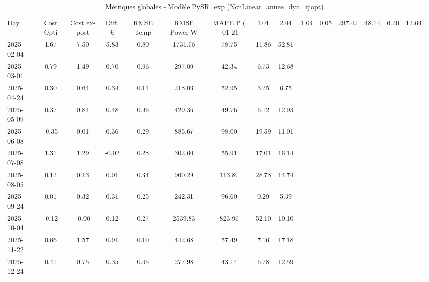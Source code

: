 \begin{table}
\caption{Métriques globales - Modèle PySR_exp (NonLinear_annee_dyn_ipopt)}
\label{tab:PySR_exp_NonLinear_annee_dyn_ipopt_Validation_EPlus_VS_Opti}
\begin{small}
\begin{tabular}{lcccccccc}
\toprule
Day & Cost Opti & Cost ex-post & Diff. € & RMSE Temp & RMSE Power W & MAPE P (%
-01-21 & 1.01 & 2.04 & 1.03 & 0.05 & 297.42 & 48.14 & 6.20 & 12.64 \\
2025-02-04 & 1.67 & 7.50 & 5.83 & 0.80 & 1731.06 & 78.75 & 11.86 & 52.81 \\
2025-03-01 & 0.79 & 1.49 & 0.70 & 0.06 & 297.00 & 42.34 & 6.73 & 12.68 \\
2025-04-24 & 0.30 & 0.64 & 0.34 & 0.11 & 218.06 & 52.95 & 3.25 & 6.75 \\
2025-05-09 & 0.37 & 0.84 & 0.48 & 0.96 & 429.36 & 49.76 & 6.12 & 12.93 \\
2025-06-08 & -0.35 & 0.01 & 0.36 & 0.29 & 885.67 & 98.00 & 19.59 & 11.01 \\
2025-07-08 & 1.31 & 1.29 & -0.02 & 0.28 & 302.60 & 55.91 & 17.01 & 16.14 \\
2025-08-05 & 0.12 & 0.13 & 0.01 & 0.34 & 960.29 & 113.80 & 28.78 & 14.74 \\
2025-09-24 & 0.01 & 0.32 & 0.31 & 0.25 & 242.31 & 96.60 & 0.29 & 5.39 \\
2025-10-04 & -0.12 & -0.00 & 0.12 & 0.27 & 2539.83 & 823.96 & 52.10 & 10.10 \\
2025-11-22 & 0.66 & 1.57 & 0.91 & 0.10 & 442.68 & 57.49 & 7.16 & 17.18 \\
2025-12-24 & 0.41 & 0.75 & 0.35 & 0.05 & 277.98 & 43.14 & 6.78 & 12.59 \\
\bottomrule
\end{tabular}
\end{small}
\end{table}
